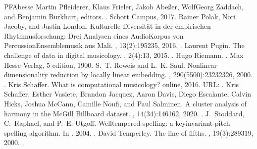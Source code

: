 \documentclass[letterpaper,10pt,english]{sphinxmanual}
\begin{document}
\begin{sphinxthebibliography}{PFAbesse}
Martin Pfleiderer, Klaus Frieler, Jakob Abeßer, Wolf\sphinxhyphen{}Georg Zaddach, and Benjamin Burkhart, editors. . Schott Campus, 2017.
Rainer Polak, Nori Jacoby, and Justin London. Kulturelle Diversität in der empirischen Rhythmusforschung: Drei Analysen eines Audio\sphinxhyphen{}Korpus von Percussion\sphinxhyphen{}Ensemblemusik aus Mali. , 13(2):195\textendash{}235, 2016. .
Laurent Pugin. The challenge of data in digital musicology. , 2(4):1\textendash{}3, 2015. .
Hugo Riemann. . Max Hesse Verlag, 5 edition, 1900.
S. T. Roweis and L. K. Saul. Nonlinear dimensionality reduction by locally linear embedding. , 290(5500):2323\textendash{}2326, 2000. .
Kris Schaffer. What is computational musicology? online, 2016. URL: .
Kris Schaffer, Esther Vasiete, Brandon Jacquez, Aaron Davis, Diego Escalante, Calvin Hicks, Joshua McCann, Camille Noufi, and Paul Salminen. A cluster analysis of harmony in the McGill Billboard dataset. , 14(3\textendash{}4):146\textendash{}162, 2020. .
J. Stoddard, C. Raphael, and P. E. Utgoff. Well\sphinxhyphen{}tempered spelling: a key\sphinxhyphen{}invariant pitch spelling algorithm. In . 2004. .
David Temperley. The line of fifths. , 19(3):289\textendash{}319, 2000. .

\end{sphinxthebibliography}
\end{document}
